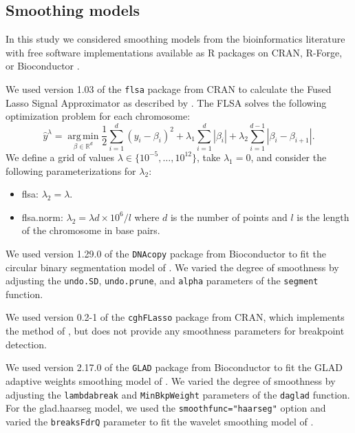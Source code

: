 \documentclass{bioinfo}
\newcommand{\argmin}{\operatorname*{arg\, min}}
\newcommand{\model}[1]{#1}
\newcommand{\code}[1]{\texttt{#1}}
\newcommand{\package}[1]{\texttt{#1}}
\newcommand{\RR}{\mathbb R}
\begin{document}
\begin{methods}
\subsection{Smoothing models}\label{models}

In this study we considered smoothing models from the bioinformatics
literature with free software implementations available as R packages
on CRAN, R-Forge, or Bioconductor \citep{R,R-Forge,Bioconductor}.



We used version 1.03 of the \package{flsa} package from CRAN to
calculate the Fused Lasso Signal Approximator as described by
\cite{fused-lasso-path}. The FLSA solves the following optimization
problem for each chromosome:
\begin{equation}
  \label{eq:flsa}
  \hat y^\lambda = 
\argmin_{\beta\in\RR^d} 
\frac 1 2 \sum_{i=1}^d (y_i-\beta_i)^2
+\lambda_1\sum_{i=1}^d|\beta_i|
+\lambda_2\sum_{i=1}^{d-1}|\beta_i-\beta_{i+1}|.
\end{equation}
We define a grid of values $\lambda\in\{10^{-5},\dots,10^{12}\}$, take
$\lambda_1=0$, and consider the following parameterizations for
$\lambda_2$:
\begin{itemize}
\item \model{flsa}: $\lambda_2=\lambda$.
\item \model{flsa.norm}: $\lambda_2=\lambda d \times 10^6/l$ where
  $d$ is the number of points and $l$ is the length of the chromosome
  in base pairs.
\end{itemize}


We used version 1.29.0 of the \package{DNAcopy} package from
Bioconductor to fit the circular binary segmentation model of
\cite{dnacopy}. We varied the degree of smoothness by adjusting the
\code{undo.SD}, \code{undo.prune}, and \code{alpha} parameters of the
\code{segment} function.

We used version 0.2-1 of the \package{cghFLasso} package from CRAN,
which implements the method of \cite{cghFLasso}, but does not provide
any smoothness parameters for breakpoint detection.

We used version 2.17.0 of the \package{GLAD} package from Bioconductor
to fit the GLAD adaptive weights smoothing model of \cite{glad}. We
varied the degree of smoothness by adjusting the \code{lambdabreak}
and \code{MinBkpWeight} parameters of the \code{daglad} function. For
the \model{glad.haarseg} model, we used the
\code{smoothfunc="haarseg"} option and varied the \texttt{breaksFdrQ}
parameter to fit the wavelet smoothing model of \cite{haarseg}.


\end{methods}
\end{document}
